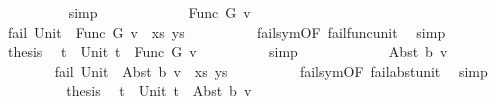 \begin{isabellebody}
\ \ \ \ \ \ \ \ \isamarkupfalse%
\ simp\isanewline
\ \ \ \ \isamarkupfalse%
\isanewline
\ \ \ \ \ \ \isamarkupfalse%
\ {\isacharparenleft}{\kern0pt}Func\ G\ v{\isacharparenright}{\kern0pt}\isanewline
\ \ \ \ \ \ %
\isanewline
\ \ \ \ \ \ \isamarkupfalse%
\ {\isachardoublequoteopen}fail\ {\isacharparenleft}{\kern0pt}{\isacharparenleft}{\kern0pt}Unit\ {\isasymapprox}{\isacharquery}{\kern0pt}\ Func\ G\ v{\isacharparenright}{\kern0pt}\ {\isacharhash}{\kern0pt}\ xs{\isacharcomma}{\kern0pt}\ ys{\isacharparenright}{\kern0pt}{\isachardoublequoteclose}\isanewline
\ \ \ \ \ \ \ \ \isamarkupfalse%
\ fail{\isacharunderscore}{\kern0pt}sym{\isacharbrackleft}{\kern0pt}OF\ fail{\isacharunderscore}{\kern0pt}func{\isacharunderscore}{\kern0pt}unit{\isacharbrackright}{\kern0pt}\ \isamarkupfalse%
\ simp\isanewline
\ \ \ \ \ \ \isamarkupfalse%
\ \isamarkupfalse%
\ {\isacharquery}{\kern0pt}thesis\ \isamarkupfalse%
\ {\isacartoucheopen}t{}\ {\isacharequal}{\kern0pt}\ Unit{\isacartoucheclose}\ {\isacartoucheopen}t{}\ {\isacharequal}{\kern0pt}\ Func\ G\ v{\isacartoucheclose}\isanewline
\ \ \ \ \ \ \ \ \isamarkupfalse%
\ simp\isanewline
\ \ \ \ \isamarkupfalse%
\isanewline
\ \ \ \ \ \ \isamarkupfalse%
\ {\isacharparenleft}{\kern0pt}Abst\ b\ v{\isacharparenright}{\kern0pt}\isanewline
\ \ \ \ \ \ %
\isanewline
\ \ \ \ \ \ \isamarkupfalse%
\ {\isachardoublequoteopen}fail\ {\isacharparenleft}{\kern0pt}{\isacharparenleft}{\kern0pt}Unit\ {\isasymapprox}{\isacharquery}{\kern0pt}\ Abst\ b\ v{\isacharparenright}{\kern0pt}\ {\isacharhash}{\kern0pt}\ xs{\isacharcomma}{\kern0pt}\ ys{\isacharparenright}{\kern0pt}{\isachardoublequoteclose}\isanewline
\ \ \ \ \ \ \ \ \isamarkupfalse%
\ fail{\isacharunderscore}{\kern0pt}sym{\isacharbrackleft}{\kern0pt}OF\ fail{\isacharunderscore}{\kern0pt}abst{\isacharunderscore}{\kern0pt}unit{\isacharbrackright}{\kern0pt}\ \isamarkupfalse%
\ simp\isanewline
\ \ \ \ \ \ \isamarkupfalse%
\ \isamarkupfalse%
\ {\isacharquery}{\kern0pt}thesis\ \isamarkupfalse%
\ {\isacartoucheopen}t{}\ {\isacharequal}{\kern0pt}\ Unit{\isacartoucheclose}\ {\isacartoucheopen}t{}\ {\isacharequal}{\kern0pt}\ Abst\ b\ v{\isacartoucheclose}\isanewline

\end{isabellebody}
